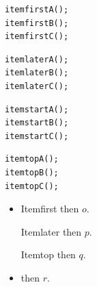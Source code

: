 \documentclass{article}
\begin{document}
\begin{lrbox}{\lstbox}\begin{lstlisting}
itemfirstA();
itemfirstB();
itemfirstC();
\end{lstlisting}\end{lrbox}
\begin{lrbox}{\lstboxb}\begin{lstlisting}
itemlaterA();
itemlaterB();
itemlaterC();
\end{lstlisting}\end{lrbox}
\begin{lrbox}{\lstboxd}\begin{lstlisting}
itemstartA();
itemstartB();
itemstartC();
\end{lstlisting}\end{lrbox}
\begin{lrbox}{\lstboxc}\begin{lstlisting}[boxpos=t]
itemtopA();
itemtopB();
itemtopC();
\end{lstlisting}\end{lrbox}
\begin{itemize}
\item Itemfirst \fbox{\usebox{\lstbox}} then $o$.

Itemlater \fbox{\usebox{\lstboxb}} then $p$.

Itemtop \fbox{\usebox{\lstboxc}} then $q$.
\item \fbox{\usebox{\lstboxd}} then $r$.
\end{itemize}
\end{document}
